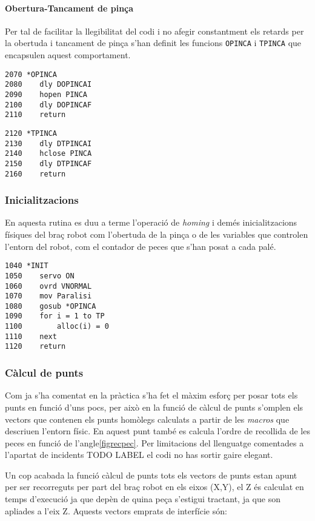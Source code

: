 \paragraph{Obertura-Tancament de pinça}
Per tal de facilitar la llegibilitat del codi i no afegir constantment
els retards per la obertuda i tancament de pinça s'han definit les funcions
\texttt{OPINCA} i \texttt{TPINCA} que encapsulen aquest comportament.

\begin{verbatim}
2070 *OPINCA
2080    dly DOPINCAI
2090    hopen PINCA
2100    dly DOPINCAF
2110    return
\end{verbatim}
\begin{verbatim}
2120 *TPINCA
2130    dly DTPINCAI
2140    hclose PINCA
2150    dly DTPINCAF
2160    return
\end{verbatim}

\subsubsection{Inicialitzacions}
En aquesta rutina es duu a terme l'operació de \emph{homing} i demés
inicialitzacions físiques del braç robot com l'obertuda de la pinça
o de les variables que controlen l'entorn del robot, com el 
contador de peces que s'han posat a cada palé.

\begin{verbatim}
1040 *INIT
1050    servo ON
1060    ovrd VNORMAL
1070    mov Paralisi
1080    gosub *OPINCA
1090    for i = 1 to TP
1100        alloc(i) = 0
1110    next
1120    return
\end{verbatim}

\subsubsection{Càlcul de punts}\label{codcalcpts}
Com ja s'ha comentat en la pràctica s'ha fet el màxim esforç per posar tots els
punts en funció d'uns pocs, per això en la funció de càlcul de punts s'omplen
els vectors que contenen els punts homòlegs calculats a partir de les
\emph{macros} que descriuen l'entorn físic. En aquest punt també es calcula
l'ordre de recollida de les peces en funció de l'angle\ref{figrecpec}. Per limitacions del
llenguatge comentades a l'apartat de incidents TODO LABEL el codi no has
sortir gaire elegant.

Un cop acabada la funció càlcul de punts tots els vectors de punts estan apunt
per ser recorreguts per part del braç robot en els eixos (X,Y), el Z és
calculat en temps d'execució ja que depèn de quina peça s'estigui tractant,
ja que son apliades a l'eix Z.
Aquests vectors emprats de interfície són:

